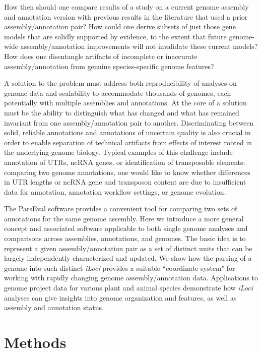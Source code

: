 How then should one compare results of a study on a current genome assembly and annotation version with previous results in the literature that used a prior
assembly/annotation pair?
How could one derive subsets of just those gene models that are solidly supported by evidence, to the extent that future genome-wide assembly/annotation improvements will not invalidate these current models?
How does one disentangle artifacts of incomplete or inaccurate assembly/annotation from genuine species-specific genome features?

A solution to the problem must address both reproducibility of analyses on genome data and scalability to accommodate thousands of genomes, each potentially with multiple assemblies and annotations.
At the core of a solution must be the ability to distinguish what has changed and what has remained invariant from one assembly/annotation pair to another.
Discriminating between solid, reliable annotations and annotations of uncertain quality is also crucial in order to enable separation of technical artifacts from effects of interest rooted in the underlying genome biology.
Typical examples of this challenge include  annotation of UTRs, ncRNA genes, or identification of transposable elements: comparing two genome annotations, one would like to know whether differences in UTR lengths or ncRNA gene and transposon content are due to insufficient data for annotation, annotation workflow settings, or genome evolution.

The ParsEval software \cite{StandageBrendel2012} provides a convenient tool for comparing two sets of annotations for the same genome assembly.
Here we introduce a more general concept and associated software applicable to both single genome analyses and comparisons across assemblies, annotations, and genomes.
The basic idea is to represent a given assembly/annotation pair as a set of distinct units that can be largely independently characterized and updated.
We show how the parsing of a genome into such distinct \textit{iLoci} provides a suitable ``coordinate system" for working with rapidly changing genome assembly/annotation data.
Applications to genome project data for various plant and animal species demonstrate how \textit{iLoci} analyses can give insights into genome organization and features, as well as assembly and annotation status.

\section{Methods}

